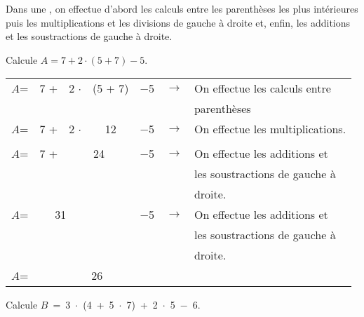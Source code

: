 
\begin{methode*1}

\begin{aconnaitre}
Dans une , on effectue d'abord les calculs entre les parenthèses les plus intérieures puis les multiplications et les divisions de gauche à droite et, enfin, les additions et les soustractions de gauche à droite.
\end{aconnaitre}

\begin{exemple*1}
Calcule $A = 7 + 2 \cdot (5 + 7) - 5$.

\begin{center}
 \begin{tabularx}{\linewidth}{ccccccX}
  $A$= & 7  + & 2  $\cdot$ & (5 + 7) & $-$5 &  $\rightarrow$ & On effectue les calculs entre \\ \cline{4-4}
  & & & & & & parenthèses \\
  $A$= & 7  + & 2  $\cdot$ & 12 & $-$5 &  $\rightarrow$ & On effectue les multiplications. \\ \cline{3-4}
  & & & & & & \\
  $A$= & 7  + & \multicolumn{2}{c}{24} & $-$5  & $\rightarrow$ & On effectue les additions et \\ \cline{2-4}
   & & & & & & les soustractions de gauche à\\
   & & & & & & droite.\\
  $A$= &  \multicolumn{2}{c}{31} & & $-$5 &  $\rightarrow$ & On effectue les additions et\\ \cline{2-5}
   & & & & & & les soustractions de gauche à\\
   & & & & & & droite.\\
  $A$= &  \multicolumn{4}{c}{26}  &  & \\
  \end{tabularx}
\end{center}
\end{exemple*1}

\begin{exemple*1}
Calcule $B$ = 3 $\cdot$ (4 + 5 $\cdot$ 7) + 2 $\cdot$ 5 $-$ 6.


\end{exemple*1}
\end{methode*1}
